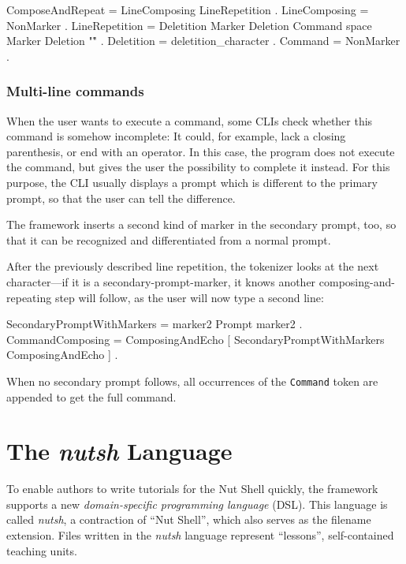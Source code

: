 \documentclass[paper=a4,twoside,abstract=on,cleardoublepage=empty,numbers=noenddot,toc=bib,toc=listof,12pt,appendixprefix=true]{scrreprt}
\begin{document}
\begin{ebnf}
ComposeAndRepeat = LineComposing LineRepetition .
LineComposing = { NonMarker } .
LineRepetition = Deletition Marker Deletion Command
    space Marker Deletion "\r" .
Deletition = { deletition_character } .
Command = { NonMarker } .
\end{ebnf}

\subsection*{Multi-line commands}

When the user wants to execute a command, some \textsc{CLI}s check whether this command is somehow incomplete: It could, for example, lack a closing parenthesis, or end with an operator. In this case, the program does not execute the command, but gives the user the possibility to complete it instead. For this purpose, the CLI usually displays a prompt which is different to the primary prompt, so that the user can tell the difference.

The framework inserts a second kind of marker in the secondary prompt, too, so that it can be recognized and differentiated from a normal prompt.

After the previously described line repetition, the tokenizer looks at the next character---if it is a secondary-prompt-marker, it knows another composing-and-repeating step will follow, as the user will now type a second line:

\begin{ebnf}
SecondaryPromptWithMarkers = marker2 Prompt marker2 .
CommandComposing = ComposingAndEcho
    [ { SecondaryPromptWithMarkers ComposingAndEcho } ] .
\end{ebnf}
%
When no secondary prompt follows, all occurrences of the \texttt{Command} token are appended to get the full command.

\chapter{The \emph{nutsh} Language}
\label{sec:lang}

To enable authors to write tutorials for the Nut Shell quickly, the framework supports a new \emph{domain-specific programming language} (\textsc{DSL}). This language is called \emph{nutsh}, a contraction of “Nut Shell”, which also serves as the filename extension. Files written in the \emph{nutsh} language represent “lessons”, self-contained teaching units.
\end{document}
